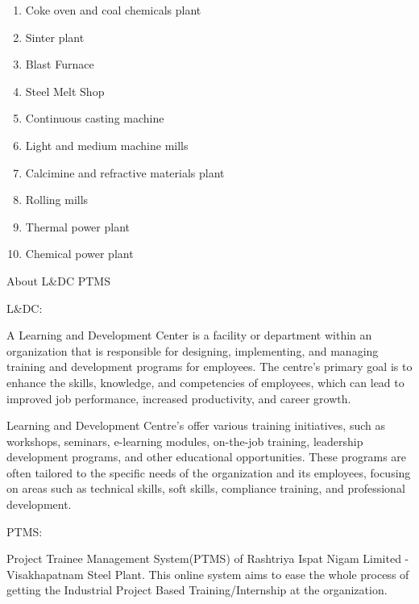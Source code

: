 \documentclass{article} %
\begin{document}
\begin{enumerate}
\item  Coke oven and coal chemicals plant 

\item  Sinter plant 

\item  Blast Furnace 

\item  Steel Melt Shop 

\item  Continuous casting machine 

\item  Light and medium machine mills 

\item  Calcimine and refractive materials plant 

\item  Rolling mills 

\item  Thermal power plant 

\item  Chemical power plant
\end{enumerate}

\noindent 

 About L\&DC PTMS

\noindent L\&DC:

\noindent A Learning and Development Center is a facility or department within an organization that is responsible for designing, implementing, and managing training and development programs for employees. The centre's primary goal is to enhance the skills, knowledge, and competencies of employees, which can lead to improved job performance, increased productivity, and career growth.

\noindent Learning and Development Centre's offer various training initiatives, such as workshops, seminars, e-learning modules, on-the-job training, leadership development programs, and other educational opportunities. These programs are often tailored to the specific needs of the organization and its employees, focusing on areas such as technical skills, soft skills, compliance training, and professional development.

\noindent 

\noindent PTMS:

\noindent Project Trainee Management System(PTMS) of Rashtriya Ispat Nigam Limited - Visakhapatnam Steel Plant. This online system aims to ease the whole process of getting the Industrial Project Based Training/Internship at the organization.
\end{document}

